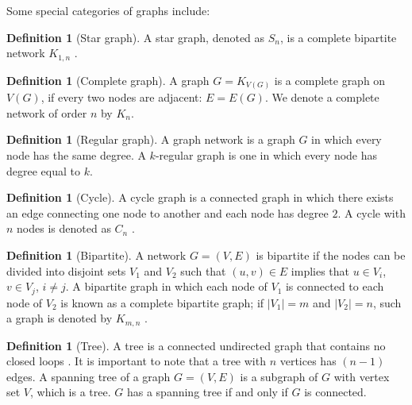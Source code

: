 \documentclass[10pt,a4paper]{article}
\theoremstyle{plain}
\theoremstyle{definition}
\newtheorem{defn}[subsection]{Definition}
\begin{document}
Some special categories of graphs include:\\

\begin{defn}[Star graph]
	A star graph, denoted as $S_n$, is a complete bipartite network $K_{1,n}$ \citep{wilson1970introduction}.\\
\end{defn}

\begin{defn}[Complete graph]
	A graph $G = K_{V (G)}$ is a complete graph on $V(G)$, if every two nodes are adjacent: $E = E(G)$. We denote a complete network of order $n$ by $K_n$. \\
\end{defn}

\begin{defn}[Regular graph]
	A graph network is a graph $G$ in which every node has the same degree. A $k$-regular graph is one in which every node has degree equal to $k$.\\
\end{defn}

\begin{defn}[Cycle]
	A cycle graph is a connected graph in which there exists an edge connecting one node to another and each node has degree $2$. A cycle with $n$ nodes is denoted as $C_n$ \citep{wilson1970introduction}.\\
\end{defn} 

\begin{defn}[Bipartite]
	A network $G=(V,E)$ is bipartite if the nodes can be divided into disjoint sets $V_1$ and $V_2$ such that $(u,v) \in E$ implies that $u \in V_i$, $v \in V_j$, $i\neq j$. A  bipartite graph in which each node of $V_1$ is connected to each node of $V_2$ is known as a complete bipartite graph; if $|V_1|= m$ and $|V_2|= n$, such a graph is denoted by $K_{m,n}$ \citep{newman2010networks}. \\
\end{defn}

\begin{defn}[Tree]
	A tree is a connected undirected graph that contains no closed loops \citep{newman2010networks}. It is important to note that a tree with $n$ vertices has $(n-1)$ edges. A spanning tree of a graph $G=(V,E)$ is a subgraph of $G$ with vertex set $V$, which is a tree. $G$ has a spanning tree if and only if $G$ is connected. \\
\end{defn}
\end{document}
